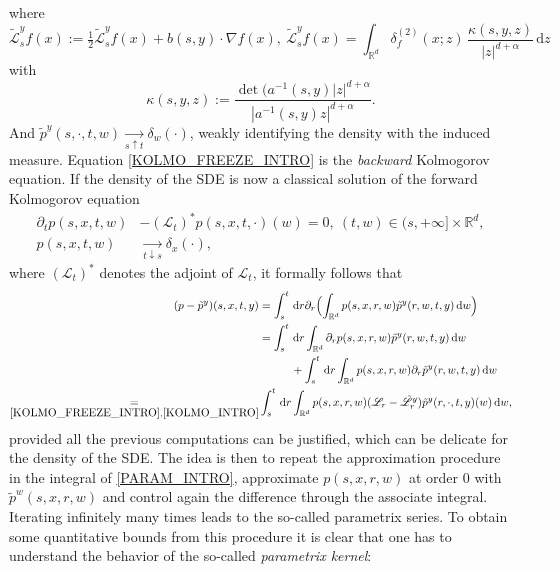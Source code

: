\documentclass[JEP,XML,SOM,Unicode,published]{cedram}
\newcommand{\rd}{\mathrm{d}}
\theoremstyle{plain}
\theoremstyle{definition}
\let\p\partial
\newcommand\cL{{\mathcal L}}
\newcommand\mR{\mathbb{R}}
\newcommand\1{{\mathbf{1}}}
\newcommand\sL{{\mathscr L}}
\newcommand{\dif}{\,\mathrm{d}}
\begin{document}
{\begin{equation}
\end{equation}
where
\[
\tilde \sL^{y}_{s} f(x):=\tfrac 12\tilde \cL^{y}_{s} f(x)+b(s, y)\cdot\nabla f(x),\
\tilde \cL^{y}_{s} f(x)=\int_{\mR^d}\delta^{(2)}_f(x;z)\,\frac{\kappa(s,y,z)}{|z|^{d+\alpha}}\,\rd z
\]
with
\[
\kappa(s,y,z):=\frac{\det(a^{-1}(s,y)|z|^{d+\alpha}}{|a^{-1}(s,y)z|^{d+\alpha}}.
\]
And $\tilde p^{y}(s,\cdot,t,w) \underset{s\uparrow t}{\longrightarrow} \delta_w(\cdot)$, weakly identifying the density with the induced measure. Equation \eqref{KOLMO_FREEZE_INTRO} is the \textit{backward} Kolmogorov equation. If the density of the SDE is now a classical solution of the forward Kolmogorov equation
\begin{equation}
\begin{aligned}\label{KOLMO_INTRO}
\p_t p(s,x,t,w)&-({\sL}_t)^*p(s,x,t,\cdot)(w)=0,\ (t,w)\in (s,+\infty]\times \mR^d,\\
p(s,x,t,w) &\underset{t\downarrow s}{\longrightarrow} \delta_x(\cdot),
\end{aligned}
\end{equation}
where $({\sL}_t)^* $ denotes the adjoint of ${\sL}_t $,
it formally follows that
\begin{equation}
\begin{aligned}
(p-\tilde p^y)(s,x,t,y)&=\int_s^t \dif r \partial_r\Bigl(\int_{\mR^d}p(s,x,r,w) \tilde p^y(r,w,t,y) \dif w\Bigr)\\
&=\int_s^t \dif r \int_{\mR^d} \partial_r p(s,x,r,w) \tilde p^y(r,w,t,y) \dif w\\
&\hspace*{1cm}+\int_s^t \dif r \int_{\mR^d} p(s,x,r,w) \partial_r\tilde p^y(r,w,t,y) \dif w\\
\underset{\eqref{KOLMO_FREEZE_INTRO}, \eqref{KOLMO_INTRO}}{=}
&\int_s^t \dif r \int_{\mR^d} p(s,x,r,w)({\sL}_r-\tilde {\sL}_r^y)\tilde p^y (r,\cdot,t,y)(w)\dif w,
\label{PARAM_INTRO}
\end{aligned}
\end{equation}
provided all the previous computations can be justified, which can be delicate for the density of the SDE. The idea is then to repeat the approximation procedure in the integral of \eqref{PARAM_INTRO}, \ie approximate $p(s,x,r,w)$ at order 0 with $\tilde p^w(s,x,r,w)$ and control again the difference through the associate integral. Iterating infinitely many times leads to the so-called parametrix series. To obtain some quantitative bounds from this procedure it is clear that one has to understand the behavior of the so-called \textit{parametrix kernel}:
\begin{align*}

\end{align*}}
\end{document}
